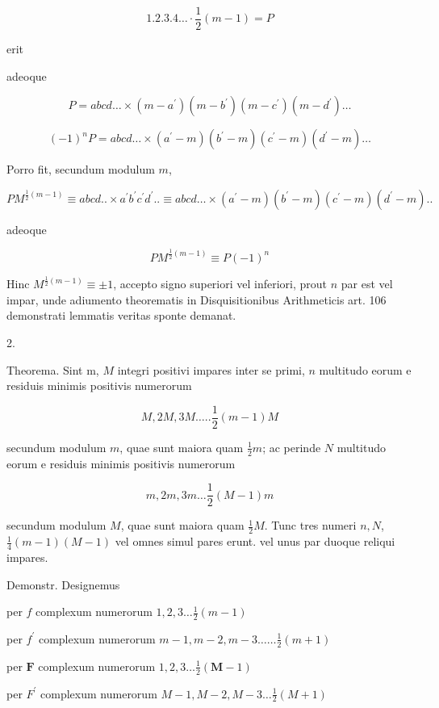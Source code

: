 \documentclass[10pt]{article}
\begin{document}
\[
1.2 .3 .4 \ldots \cdot \frac{1}{2}(m-1)=P
\]

erit

adeoque

\[
P=a b c d \ldots \times\left(m-a^{\prime}\right)\left(m-b^{\prime}\right)\left(m-c^{\prime}\right)\left(m-d^{\prime}\right) \ldots
\]

\[
(-1)^{n} P=a b c d \ldots \times\left(a^{\prime}-m\right)\left(b^{\prime}-m\right)\left(c^{\prime}-m\right)\left(d^{\prime}-m\right) \ldots
\]

Porro fit, secundum modulum \(m\),

\[
P M^{\frac{1}{2}(m-1)} \equiv a b c d . . \times a^{\prime} b^{\prime} c^{\prime} d^{\prime} . . \equiv a b c d \ldots \times\left(a^{\prime}-m\right)\left(b^{\prime}-m\right)\left(c^{\prime}-m\right)\left(d^{\prime}-m\right) . .
\]

adeoque

\[
P M^{\frac{1}{2}(m-1)} \equiv P(-1)^{n}
\]

Hinc \(M^{\frac{1}{2}(m-1)} \equiv \pm 1\), accepto signo superiori vel inferiori, prout \(n\) par est vel impar, unde adiumento theorematis in Disquisitionibus Arithmeticis art. 106 demonstrati lemmatis veritas sponte demanat.

2.

Theorema. Sint m, \(M\) integri positivi impares inter se primi, \(n\) multitudo eorum e residuis minimis positivis numerorum

\[
M, 2 M, 3 M \ldots . . \frac{1}{2}(m-1) M
\]

secundum modulum \(m\), quae sunt maiora quam \(\frac{1}{2} m\); ac perinde \(N\) multitudo eorum e residuis minimis positivis numerorum

\[
m, 2 m, 3 m \ldots \frac{1}{2}(M-1) m
\]

secundum modulum \(M\), quae sunt maiora quam \(\frac{1}{2} M\). Tunc tres numeri \(n, N\), \(\frac{1}{4}(m-1)(M-1)\) vel omnes simul pares erunt. vel unus par duoque reliqui impares.

Demonstr. Designemus

per \(f\) complexum numerorum \(1,2,3 \ldots \frac{1}{2}(m-1)\)

per \(f^{\prime}\) complexum numerorum \(m-1, m-2, m-3 \ldots \ldots \frac{1}{2}(m+1)\)

per \(\boldsymbol{F}\) complexum numerorum \(1,2,3 \ldots \frac{1}{2}(\boldsymbol{M}-1)\)

per \(F^{\prime}\) complexum numerorum \(M-1, M-2, M-3 \ldots \frac{1}{2}(M+1)\)
\end{document}

